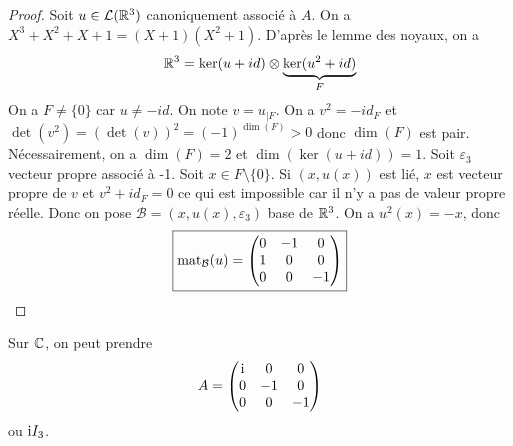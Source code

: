 \documentclass[12pt]{article}
\begin{document}
\begin{proof}
	Soit $u\in\mathcal{L}(\mathbb{R}^{3})$ canoniquement associé à $A$. On a $X^{3}+X^{2}+X+1=(X+1)(X^{2}+1)$. D'après le lemme des noyaux, on a 
	\begin{equation}
		\mathbb{R}^{3}=\ker(u+id)\otimes\underbrace{\ker(u^{2}+id)}_{F}
	\end{equation}
	On a $F\neq\lbrace0\rbrace$ car $u\neq-id$. On note $v=u_{\mid F}$. On a $v^{2}=-id_{F}$ et $\det(v^{2})=(\det(v))^{2}=(-1)^{\dim(F)}>0$ donc $\dim(F)$ est pair. Nécessairement, on a $\dim(F)=2$ et $\dim(\ker(u+id))=1$. Soit $\varepsilon_{3}$ vecteur propre associé à -1. Soit $x\in F\setminus\lbrace0\rbrace$. Si $(x,u(x))$ est lié, $x$ est vecteur propre de $v$ et $v^{2}+id_{F}=0$ ce qui est impossible car il n'y a pas de valeur propre réelle. Donc on pose $\mathcal{B}=(x,u(x),\varepsilon_{3})$ base de $\mathbb{R}^{3}$. On a $u^{2}(x)=-x$, donc 
	\begin{equation}
		\boxed{
			\operatorname{mat}_{\mathcal{B}}(u)=
			\begin{pmatrix}
				0&-1&0\\
				1&0&0\\
				0&0&-1
			\end{pmatrix}
		}
	\end{equation}
\end{proof}

\begin{remark}
	Sur $\mathbb{C}$, on peut prendre 
	\begin{equation}
		A=
		\begin{pmatrix}
			\mathrm{i}&0&0\\
			0&-1&0\\
			0&0&-1
		\end{pmatrix}
	\end{equation}
	ou $\mathrm{i} I_{3}$.
\end{remark}
\end{document}

